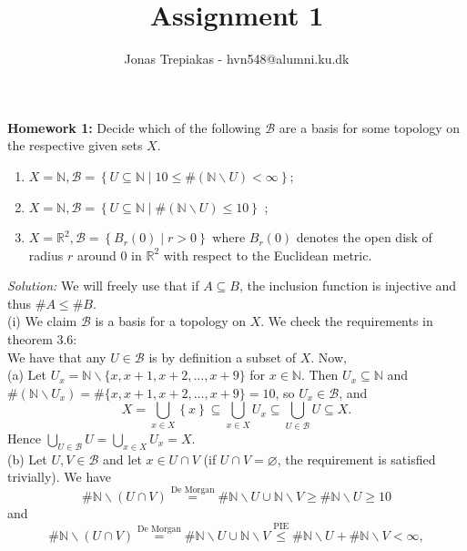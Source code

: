 \documentclass[a4paper]{article}
\title{Assignment 1}
\author{Jonas Trepiakas - hvn548@alumni.ku.dk}
\date{}
\begin{document}
\maketitle
\newpage
     \textbf{Homework 1:} Decide which of the following $\mathcal{B}$ are
     a basis for some topology on the respective given sets $X$.
    \begin{enumerate}[label=(\roman*)]
    \item $X= \mathbb{N}, \mathcal{B} = \left\{ U \subseteq \mathbb{N}  \mid 
        10 \le \# \left( \mathbb{N} \backslash U \right) <\infty \right\} $;
    \item $X = \mathbb{N}, \mathcal{B} = \left\{ U \subseteq \mathbb{N}
         \mid \# \left( \mathbb{N} \backslash U \right) \le 10 \right\} $ ;
     \item $X = \mathbb{R}^2, \mathcal{B} = \left\{ 
         B_r (0)  \mid r > 0\right\} $ where $B_r (0)$ denotes the open disk of
         radius $r$ around $0$ in $\mathbb{R}^2$ with respect to the Euclidean
         metric.
    \end{enumerate}
    \textit{Solution:} We will freely use that if $A \subseteq B$, the
    inclusion function is injective and thus $\#A \le \# B$.\\
    (i) We claim $\mathcal{B}$ is a basis for a topology on $X$.
    We check the requirements in theorem 3.6:\\
    We have that any $U \in \mathcal{B}$ is by definition a subset of $X$.
    Now,\\
    (a) Let $U_x = \mathbb{N} \backslash \{x, x+1, x+2, \ldots, x+9\}$ 
    for $x \in \mathbb{N}$. Then
    $U_x \subseteq \mathbb{N}$ and $\# \left( \mathbb{N} \backslash U_x \right) 
    = \# \{x, x+1, x+2, \ldots, x+9\} = 10$, so $U_x \in \mathcal{B}$, and
    \[
    X = \bigcup_{x \in X} \left\{ x \right\} 
    \subseteq \bigcup_{x \in X} U_x \subseteq \bigcup_{U \in \mathcal{B}} U \subseteq X
    .\] 
    Hence $\bigcup_{U \in \mathcal{B}} U = \bigcup_{x \in X} U_x = X$.\\
    (b) Let $U, V \in \mathcal{B}$ and let $x \in U \cap V$ (if $U \cap
    V = \varnothing$, the requirement is satisfied trivially).
    We have 
    \[
    \# \mathbb{N} \backslash \left( U \cap V \right) 
    \stackrel{\text{De Morgan}}{=} \# \mathbb{N} \backslash U \cup \mathbb{N} \backslash V \ge \# \mathbb{N}
\backslash U \ge 10\]
and
\[
\# \mathbb{N} \backslash \left( U \cap V \right) 
\stackrel{\text{De Morgan}}{=} \# \mathbb{N} \backslash
U \cup \mathbb{N} \backslash V \stackrel{\text{PIE}}{\le} \# \mathbb{N} \backslash U + \#  \mathbb{N}
\backslash V < \infty
,\] 
\end{document}

